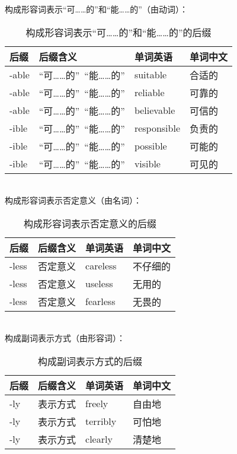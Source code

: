 \documentclass[UTF8]{ctexart}
\begin{document}
    构成形容词表示“可……的”和“能……的”（由动词）：
    \begin{table}[h!]
        \begin{center}
            \ttfamily
            \begin{tabular}{p{40pt}|p{120pt}|p{80pt}|p{80pt}}
                \hline
                后缀&后缀含义&单词英语&单词中文\\ \hline
                -able&“可……的”~“能……的”&suitable&合适的\\ \hline
                -able&“可……的”~“能……的”&reliable&可靠的\\ \hline
                -able&“可……的”~“能……的”&believable&可信的\\ \hline
                -ible&“可……的”~“能……的”&responsible&负责的\\ \hline
                -ible&“可……的”~“能……的”&possible&可能的\\ \hline
                -ible&“可……的”~“能……的”&visible&可见的\\ \hline
            \end{tabular}
            \rmfamily
            \caption{构成形容词表示“可……的”和“能……的”的后缀}
        \end{center}
    \end{table}\\
    构成形容词表示否定意义（由名词）：
    \begin{table}[h!]
        \begin{center}
            \ttfamily
            \begin{tabular}{p{40pt}|p{80pt}|p{80pt}|p{80pt}}
                \hline
                后缀&后缀含义&单词英语&单词中文\\ \hline
                -less&否定意义&careless&不仔细的\\ \hline
                -less&否定意义&useless&无用的\\ \hline
                -less&否定意义&fearless&无畏的\\ \hline
            \end{tabular}
            \rmfamily
            \caption{构成形容词表示否定意义的后缀}
        \end{center}
    \end{table}\\
    构成副词表示方式（由形容词）：
    \begin{table}[h!]
        \begin{center}
            \ttfamily
            \begin{tabular}{p{40pt}|p{80pt}|p{80pt}|p{80pt}}
                \hline
                后缀&后缀含义&单词英语&单词中文\\ \hline
                -ly&表示方式&freely&自由地\\ \hline
                -ly&表示方式&terribly&可怕地\\ \hline
                -ly&表示方式&clearly&清楚地\\ \hline
            \end{tabular}
            \rmfamily
            \caption{构成副词表示方式的后缀}
        \end{center}
    \end{table}\\
\end{document}

